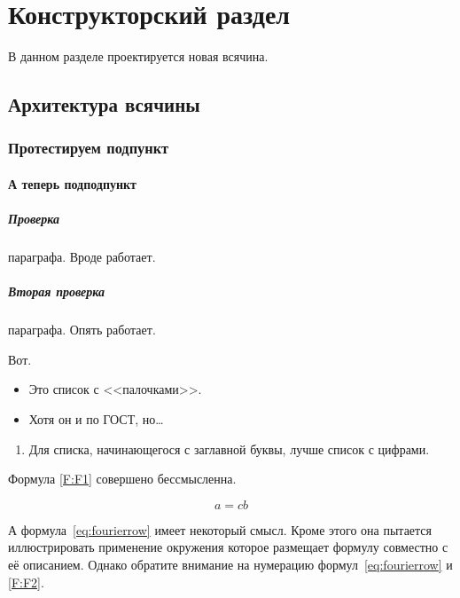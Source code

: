 \chapter{Конструкторский раздел}
\label{cha:design}

В данном разделе проектируется новая всячина.

\section{Архитектура всячины}

\subsection{Протестируем подпункт}
\subsubsection{А теперь подподпункт}


\paragraph{Проверка} параграфа. Вроде работает.
\paragraph{Вторая проверка} параграфа. Опять работает.

Вот.

\begin{itemize}
\item Это список с <<палочками>>.
\item Хотя он и по ГОСТ, но\dots
\end{itemize}

\begin{enumerate}
\item  Для списка, начинающегося с заглавной буквы, лучше список с цифрами.
\end{enumerate}

Формула \ref{F:F1} совершено бессмысленна.


\begin{equation}
a= cb
\label{F:F1}
\end{equation}

А формула~\ref{eq:fourierrow} имеет некоторый смысл.
Кроме этого она пытается иллюстрировать применение окружения  которое размещает формулу совместно с её описанием.
Однако обратите внимание на нумерацию формул~\ref{eq:fourierrow} и \ref{F:F2}. 

